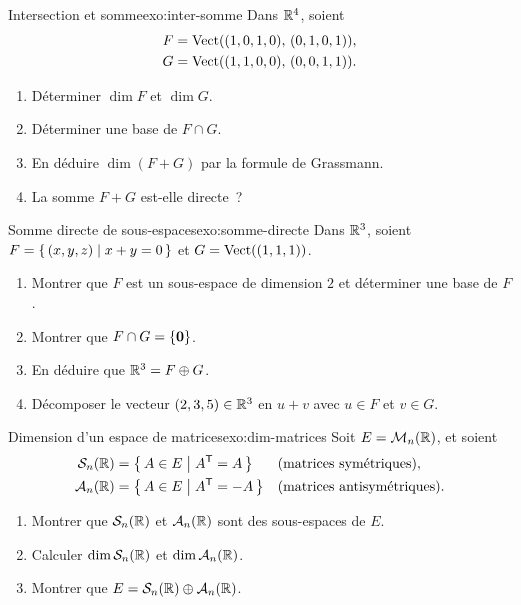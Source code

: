 \begin{exercise}{\intermediate{} Intersection et somme}{exo:inter-somme}
  Dans ${\mathbb{R}}^4$, soient
  \begin{align*}
    F &= \operatorname{Vect}((1,0,1,0),\,(0,1,0,1)), \\
    G &= \operatorname{Vect}((1,1,0,0),\,(0,0,1,1)).
  \end{align*}
  \begin{enumerate}[label=(\alph*)]
    \item Déterminer $\dim F$ et $\dim G$.
    \item Déterminer une base de $F\cap G$.
    \item En déduire $\dim(F+G)$ par la formule de Grassmann.
    \item La somme $F+G$ est-elle directe~?
  \end{enumerate}
\end{exercise}

\begin{exercise}{\intermediate{} Somme directe de sous-espaces}{exo:somme-directe}
  Dans ${\mathbb{R}}^3$, soient $F=\left\{\,(x,y,z)\;\middle|\;x+y=0\,\right\}$ et
  $G=\operatorname{Vect}((1,1,1))$.
  \begin{enumerate}[label=(\alph*)]
    \item Montrer que $F$ est un sous-espace de dimension $2$ et
      déterminer une base de $F$.
    \item Montrer que $F\cap G=\left\{\mathbf{0}\right\}$.
    \item En déduire que ${\mathbb{R}}^3=F\oplus G$.
    \item Décomposer le vecteur $(2,3,5)\in{\mathbb{R}}^3$ en $u+v$ avec $u\in F$
      et $v\in G$.
  \end{enumerate}
\end{exercise}

\begin{exercise}{\intermediate{} Dimension d'un espace de matrices}{exo:dim-matrices}
  Soit $E=\mathcal{M}_n({\mathbb{R}})$, et soient
  \begin{align*}
    \mathcal{S}_n({\mathbb{R}}) &= \left\{\,A\in E\;\middle|\;{A}^{\mathsf{T}}=A\,\right\}
    &&\text{(matrices symétriques)},\\
    \mathcal{A}_n({\mathbb{R}}) &= \left\{\,A\in E\;\middle|\;{A}^{\mathsf{T}}=-A\,\right\}
    &&\text{(matrices antisymétriques)}.
  \end{align*}
  \begin{enumerate}[label=(\alph*)]
    \item Montrer que $\mathcal{S}_n({\mathbb{R}})$ et $\mathcal{A}_n({\mathbb{R}})$ sont
      des sous-espaces de $E$.
    \item Calculer $\dim\mathcal{S}_n({\mathbb{R}})$ et $\dim\mathcal{A}_n({\mathbb{R}})$.
    \item Montrer que $E=\mathcal{S}_n({\mathbb{R}})\oplus\mathcal{A}_n({\mathbb{R}})$.
  \end{enumerate}
\end{exercise}

